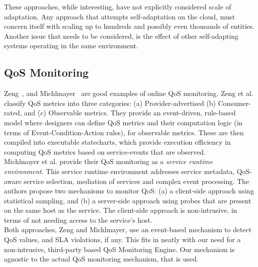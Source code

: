 \documentclass[10pt,journal,compsoc]{IEEEtran}
\begin{document}
These approaches, while interesting, have not explicitly considered scale of adaptation. Any approach that attempts self-adaptation on the cloud, must concern itself with scaling up to hundreds and possibly even thousands of entities. Another issue that needs to be considered, is the effect of other self-adapting systems operating in the same environment. \\
\subsection{QoS Monitoring}
Zeng~\cite{Zeng2007Monitoring}, and Michlmayer~\cite{Michlmayr2009Comprehensive} are good examples of online QoS monitoring. Zeng et al. classify QoS metrics into three categories: (a) Provider-advertised (b) Consumer-rated, and (c) Observable metrics. They provide an event-driven, rule-based model where designers can define QoS metrics and their computation logic (in terms of Event-Condition-Action rules), for observable metrics. These are then compiled into executable statecharts, which provide execution efficiency in computing QoS metrics based on service-events that are observed. \\
Michlmayer et al. provide their QoS monitoring as a \textit{service runtime environment}. This service runtime environment addresses service metadata, QoS-aware service selection, mediation of services and complex event processing. The authors propose two mechanisms to monitor QoS: (a) a client-side approach using statistical sampling, and (b) a server-side approach using probes that are present on the same host as the service. The client-side approach is non-intrusive, in terms of not needing access to the service's host. \\
Both approaches, Zeng and Michlmayer, use an event-based mechanism to detect QoS values, and SLA violations, if any. This fits in neatly with our need for a non-intrusive, third-party based QoS Monitoring Engine. Our mechanism is agnostic to the actual QoS monitoring mechanism, that is used. 


 
\end{document}
